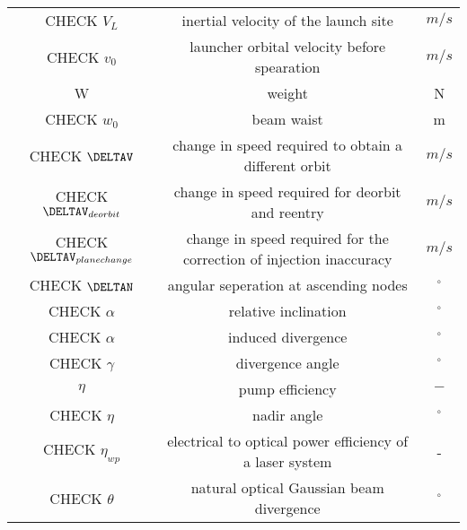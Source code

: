 \begin{center}
\begin{longtable}{c|c|c}
CHECK $V_L$                               & inertial velocity of the launch site        & $m/s$ \\

CHECK $v_0$                               & launcher orbital velocity before spearation & $m/s$ \\

W 																	& weight 																			& N \\

CHECK $w_0$                       & beam waist                                      & m \\

CHECK $\DELTAV$                           & change in speed required to obtain a different orbit & $m/s$ \\

CHECK $\DELTAV_{deorbit}$                      & change in speed required for deorbit and reentry         & $m/s$ \\ 

CHECK $\DELTAV_{planechange}$                      & change in speed required for the correction of injection inaccuracy         & $m/s$ \\ 

CHECK $\DELTAN$                               & angular seperation at ascending nodes            & $^\circ$ \\    

CHECK $\alpha$                            & relative inclination                        & $^\circ$ \\

CHECK $\alpha$                            & induced divergence                       & $^\circ$ \\

CHECK $\gamma$                             & divergence angle                         & $^\circ$ \\  

$\eta$ 															& pump efficiency 														& $-$ \\

CHECK $\eta$ 															& nadir angle														& $^\circ$ \\

CHECK $\eta_{wp}$                       & electrical to optical power efficiency of a laser system  & - \\

CHECK $\theta$                             & natural optical Gaussian beam divergence       & $^\circ$ \\


\end{longtable}
\end{center}
